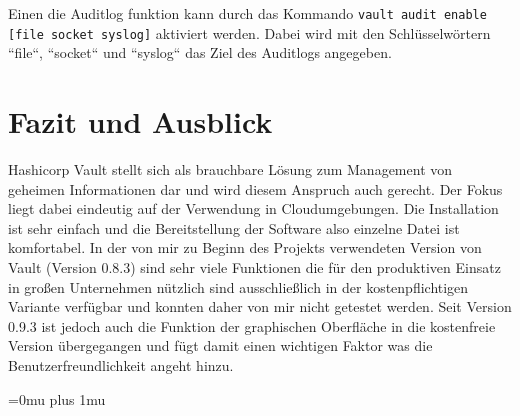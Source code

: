 \documentclass[
book,
a4paper,   
titlepage,  
halfparskip,
12pt        
]{scrartcl}
\newcommand\inline{\lstinline[basicstyle=\ttfamily]}
\begin{document}
\begin{onehalfspacing}
Einen die Auditlog funktion kann durch das Kommando \inline|vault audit enable [file socket syslog]| aktiviert werden. Dabei wird mit den Schlüsselwörtern ``file``, ``socket`` und ``syslog`` das Ziel des Auditlogs angegeben.
 
\newpage
\section{Fazit und Ausblick}
\label{sec:ausblick}

Hashicorp Vault stellt sich als brauchbare Lösung zum Management von geheimen Informationen dar und wird diesem Anspruch auch gerecht. Der Fokus liegt dabei eindeutig auf der Verwendung in Cloudumgebungen. Die Installation ist sehr einfach und die Bereitstellung der Software also einzelne Datei ist komfortabel. In der von mir zu Beginn des Projekts verwendeten Version von Vault (Version 0.8.3) sind sehr viele Funktionen die für den produktiven Einsatz in großen Unternehmen nützlich sind ausschließlich in der kostenpflichtigen Variante verfügbar und konnten daher von mir nicht getestet werden. Seit Version 0.9.3 ist jedoch auch die Funktion der graphischen Oberfläche in die kostenfreie Version übergegangen und fügt damit einen wichtigen Faktor was die Benutzerfreundlichkeit angeht hinzu.\newline

\newpage
\appendix
\Urlmuskip=0mu plus 1mu



\end{onehalfspacing}
\end{document}
